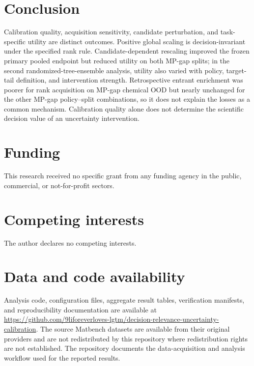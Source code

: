 \documentclass[11pt]{article}
\begin{document}
\section{Conclusion}
Calibration quality, acquisition sensitivity, candidate perturbation, and task-specific utility are distinct outcomes. Positive global scaling is decision-invariant under the specified rank rule. Candidate-dependent rescaling improved the frozen primary pooled endpoint but reduced utility on both MP-gap splits; in the second randomized-tree-ensemble analysis, utility also varied with policy, target-tail definition, and intervention strength. Retrospective entrant enrichment was poorer for rank acquisition on MP-gap chemical OOD but nearly unchanged for the other MP-gap policy--split combinations, so it does not explain the losses as a common mechanism. Calibration quality alone does not determine the scientific decision value of an uncertainty intervention.

\clearpage
\section*{Funding}
This research received no specific grant from any funding agency in the public, commercial, or not-for-profit sectors.

\section*{Competing interests}
The author declares no competing interests.

\section*{Data and code availability}
Analysis code, configuration files, aggregate result tables, verification manifests, and reproducibility documentation are available at \url{https://github.com/9liforeverloves-lgtm/decision-relevance-uncertainty-calibration}. The source Matbench datasets are available from their original providers and are not redistributed by this repository where redistribution rights are not established. The repository documents the data-acquisition and analysis workflow used for the reported results.

\clearpage
\fontsize{8}{9}\selectfont\setlength{\bibsep}{0pt}


\end{document}

